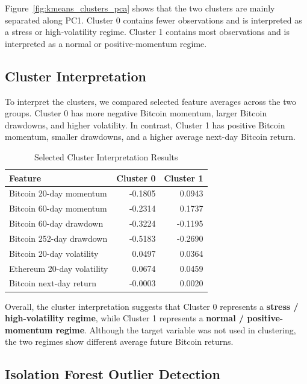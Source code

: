 \documentclass[12pt]{article}
\begin{document}
Figure~\ref{fig:kmeans_clusters_pca} shows that the two clusters are mainly separated along PC1. Cluster 0 contains fewer observations and is interpreted as a stress or high-volatility regime. Cluster 1 contains most observations and is interpreted as a normal or positive-momentum regime.

\FloatBarrier


\subsection{Cluster Interpretation}

To interpret the clusters, we compared selected feature averages across the two groups. Cluster 0 has more negative Bitcoin momentum, larger Bitcoin drawdowns, and higher volatility. In contrast, Cluster 1 has positive Bitcoin momentum, smaller drawdowns, and a higher average next-day Bitcoin return.

\begin{table}[H]
\centering
\caption{Selected Cluster Interpretation Results}
\begin{tabular}{lrr}
\toprule
\textbf{Feature} & \textbf{Cluster 0} & \textbf{Cluster 1} \\
\midrule
Bitcoin 20-day momentum & -0.1805 & 0.0943 \\
Bitcoin 60-day momentum & -0.2314 & 0.1737 \\
Bitcoin 60-day drawdown & -0.3224 & -0.1195 \\
Bitcoin 252-day drawdown & -0.5183 & -0.2690 \\
Bitcoin 20-day volatility & 0.0497 & 0.0364 \\
Ethereum 20-day volatility & 0.0674 & 0.0459 \\
Bitcoin next-day return & -0.0003 & 0.0020 \\
\bottomrule
\end{tabular}
\end{table}

Overall, the cluster interpretation suggests that Cluster 0 represents a \textbf{stress / high-volatility regime}, while Cluster 1 represents a \textbf{normal / positive-momentum regime}. Although the target variable was not used in clustering, the two regimes show different average future Bitcoin returns.

\FloatBarrier


\subsection{Isolation Forest Outlier Detection}
\end{document}
